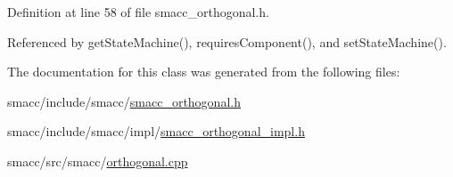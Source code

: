 Definition at line 58 of file smacc\+\_\+orthogonal.\+h.



Referenced by get\+State\+Machine(), requires\+Component(), and set\+State\+Machine().



The documentation for this class was generated from the following files\+:\begin{DoxyCompactItemize}
\item 
smacc/include/smacc/\hyperlink{smacc__orthogonal_8h}{smacc\+\_\+orthogonal.\+h}\item 
smacc/include/smacc/impl/\hyperlink{smacc__orthogonal__impl_8h}{smacc\+\_\+orthogonal\+\_\+impl.\+h}\item 
smacc/src/smacc/\hyperlink{orthogonal_8cpp}{orthogonal.\+cpp}\end{DoxyCompactItemize}
